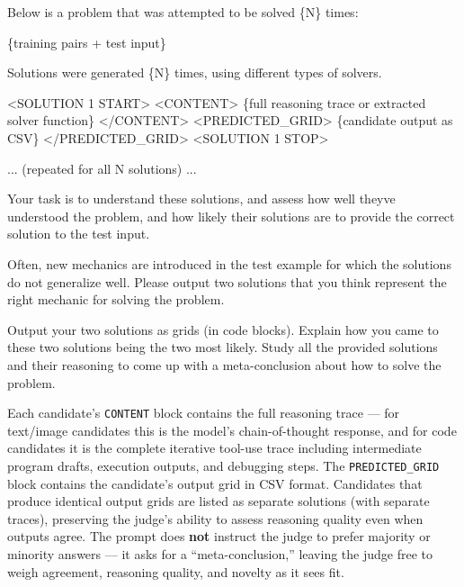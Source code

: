 \documentclass[11pt]{article}
\newenvironment{Shaded}{}{}
\newcommand{\NormalTok}[1]{#1}
\begin{document}
\begin{Shaded}
\begin{Highlighting}[]
\NormalTok{Below is a problem that was attempted to be solved \{N\} times:}

\NormalTok{\{training pairs + test input\}}

\NormalTok{Solutions were generated \{N\} times, using different types of solvers.}

\NormalTok{\textless{}SOLUTION 1 START\textgreater{}}
\NormalTok{\textless{}CONTENT\textgreater{}}
\NormalTok{\{full reasoning trace or extracted solver function\}}
\NormalTok{\textless{}/CONTENT\textgreater{}}
\NormalTok{\textless{}PREDICTED\_GRID\textgreater{}}
\NormalTok{\{candidate output as CSV\}}
\NormalTok{\textless{}/PREDICTED\_GRID\textgreater{}}
\NormalTok{\textless{}SOLUTION 1 STOP\textgreater{}}

\NormalTok{... (repeated for all N solutions) ...}

\NormalTok{Your task is to understand these solutions, and assess how well they\textquotesingle{}ve}
\NormalTok{understood the problem, and how likely their solutions are to provide the}
\NormalTok{correct solution to the test input.}

\NormalTok{Often, new mechanics are introduced in the test example for which the}
\NormalTok{solutions do not generalize well. Please output two solutions that you}
\NormalTok{think represent the right mechanic for solving the problem.}

\NormalTok{Output your two solutions as grids (in code blocks). Explain how you}
\NormalTok{came to these two solutions being the two most likely. Study all the}
\NormalTok{provided solutions and their reasoning to come up with a meta{-}conclusion}
\NormalTok{about how to solve the problem.}
\end{Highlighting}
\end{Shaded}

Each candidate's \texttt{CONTENT} block contains the full reasoning
trace --- for text/image candidates this is the model's chain-of-thought
response, and for code candidates it is the complete iterative tool-use
trace including intermediate program drafts, execution outputs, and
debugging steps. The \texttt{PREDICTED\_GRID} block contains the
candidate's output grid in CSV format. Candidates that produce identical
output grids are listed as separate solutions (with separate traces),
preserving the judge's ability to assess reasoning quality even when
outputs agree. The prompt does \textbf{not} instruct the judge to prefer
majority or minority answers --- it asks for a ``meta-conclusion,''
leaving the judge free to weigh agreement, reasoning quality, and
novelty as it sees fit.
\end{document}
